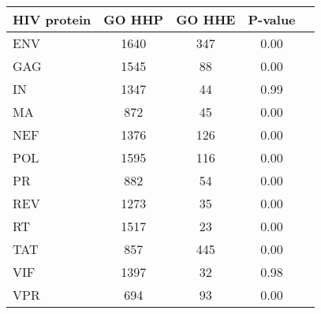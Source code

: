 \begin{table}\footnotesize
\begin{center}
  \begin{tabular}{|l|c|c|c|c|}
  \hline
  HIV protein & GO HHP & GO HHE & P-value \\
  \hline
ENV   &  1640  &  347 & 0.00 \\
GAG  &   1545  &  88 & 0.00 \\
IN   &   1347 &   44 & 0.99 \\
MA  &    872  &   45 & 0.00 \\
NEF &    1376 &   126 & 0.00 \\
POL &    1595 &   116 & 0.00 \\
PR  &    882  &   54 & 0.00 \\
REV  &   1273 &   35 & 0.00 \\
RT  &    1517 &   23 & 0.00 \\
TAT  &   857  &   445 & 0.00 \\
VIF  &   1397 &   32 & 0.98 \\
VPR  &   694  &   93 & 0.00 \\


\end{tabular}
\end{center}
\end{table}
